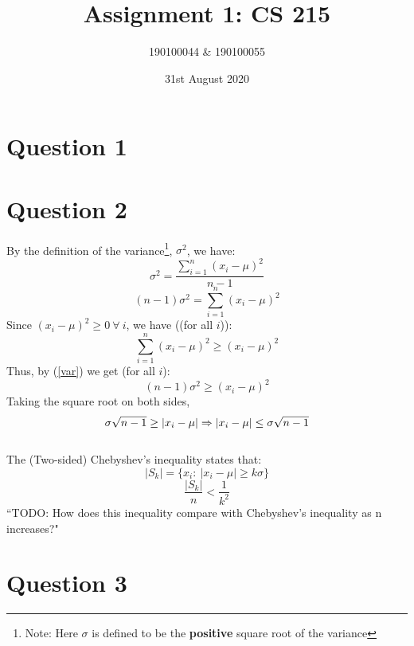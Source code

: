 \documentclass[11pt]{article}
\title{Assignment 1: CS 215}
\author{190100044 \& 190100055}
\date{31st August 2020}
\begin{document}
\maketitle
\tableofcontents
\thispagestyle{empty}

\newpage \setcounter{page}{1}
\section{Question 1}

\newpage
\section{Question 2}
By the definition of the variance\footnote{Note: Here $\sigma$ is defined to be the \textbf{positive} square root of the variance}, $\sigma^2$, we have:
$$ \sigma^2 = \frac{\sum_{i=1}^n (x_i - \mu)^2}{n-1} $$
\begin{equation}
    \label{var}
    (n-1)\sigma^2 = \sum_{i=1}^n (x_i - \mu)^2
\end{equation}
Since $(x_i - \mu)^2 \ge 0 \  \forall \ i$, we have ((for all $i$)):
$$ \sum_{i=1}^n (x_i - \mu)^2 \ge (x_i - \mu)^2  $$
Thus, by (\ref{var}) we get (for all $i$):
$$ (n-1)\sigma^2 \ge (x_i - \mu)^2 $$
Taking the square root on both sides,
$$ \sigma\sqrt{n-1} \ge |x_i - \mu| \Rightarrow |x_i - \mu| \le \sigma\sqrt{n-1} \hfill $$
\hfill \qedsymbol \\
\noindent
The (Two-sided) Chebyshev's inequality states that:
$$ |S_k| = \{ x_i : \  |x_i - \mu| \ge k\sigma \} $$
\begin{equation}
    \frac{|S_k|}{n} < \frac{1}{k^2}
\end{equation}
``TODO: How does this inequality compare with Chebyshev's inequality as n increases?"

\newpage
\section{Question 3}

\newpage
\end{document}
